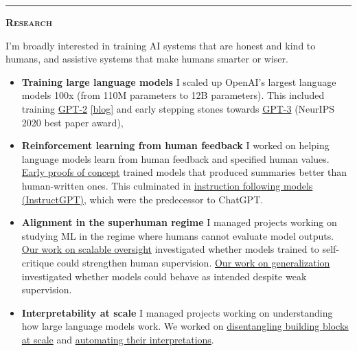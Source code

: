 \documentclass[11 pt]{article}
\begin{document}
\hrule

\begin{center}\begin{Large}\textsc{\textbf{Research}\\}\end{Large}\end{center}

I'm broadly interested in training AI systems that are honest and kind to humans, and assistive systems that make humans smarter or wiser.

\begin{itemize}

\item \textbf{Training large language models}
I scaled up OpenAI's largest language models 100x (from 110M parameters to 12B parameters).  %
This included training \href{https://d4mucfpksywv.cloudfront.net/better-language-models/language_models_are_unsupervised_multitask_learners.pdf}{GPT-2} \href{https://openai.com/blog/better-language-models/}{[blog]} and early stepping stones towards \href{https://arxiv.org/pdf/2005.14165.pdf}{GPT-3} (NeurIPS 2020 best paper award),

\item \textbf{Reinforcement learning from human feedback}
I worked on helping language models learn from human feedback and specified human values. \href{https://openai.com/blog/learning-to-summarize-with-human-feedback/}{Early proofs of concept} trained models that produced summaries better than human-written ones.  This culminated in \href{https://openai.com/blog/instruction-following/}{instruction following models (InstructGPT)}, which were the predecessor to ChatGPT.

\item \textbf{Alignment in the superhuman regime}
I managed projects working on studying ML in the regime where humans cannot evaluate model outputs. \href{https://openai.com/index/critiques/}{Our work on scalable oversight} investigated whether models trained to self-critique could strengthen human supervision.  \href{https://openai.com/index/weak-to-strong-generalization/}{Our work on generalization} investigated whether models could behave as intended despite weak supervision.

\item \textbf{Interpretability at scale}
I managed projects working on understanding how large language models work.  We worked on \href{https://openai.com/index/extracting-concepts-from-gpt-4/}{disentangling building blocks at scale} and \href{https://openai.com/index/language-models-can-explain-neurons-in-language-models/}{automating their interpretations}.


\end{itemize}
\end{document}
